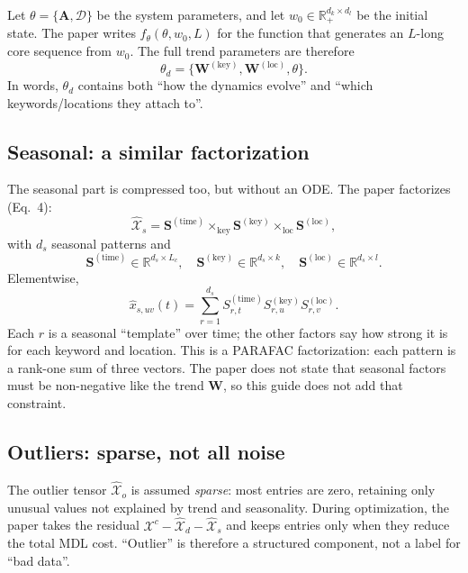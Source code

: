 Let $\theta=\{\mathbf{A},\mathcal{D}\}$ be the system parameters, and let
$w_0\in\mathbb{R}_{+}^{d_k\times d_l}$ be the initial state. The paper writes
$f_\theta(\theta,w_0,L)$ for the function that generates an $L$-long core sequence from $w_0$. The full
trend parameters are therefore
\[
  \theta_d=\{\mathbf{W}^{(\mathrm{key})},\mathbf{W}^{(\mathrm{loc})},\theta\}.
\]
In words, $\theta_d$ contains both ``how the dynamics evolve'' and ``which keywords/locations they
attach to''.

\subsection{Seasonal: a similar factorization}

The seasonal part is compressed too, but without an ODE. The paper factorizes (Eq.~4):
\begin{equation}
  \widehat{\mathcal{X}}_s
  =\mathbf{S}^{(\mathrm{time})}
   \times_{\mathrm{key}}\mathbf{S}^{(\mathrm{key})}
   \times_{\mathrm{loc}}\mathbf{S}^{(\mathrm{loc})},
  \label{eq:seasonal-factorization}
\end{equation}
with $d_s$ seasonal patterns and
\[
  \mathbf{S}^{(\mathrm{time})}\in\mathbb{R}^{d_s\times L_c},
  \quad
  \mathbf{S}^{(\mathrm{key})}\in\mathbb{R}^{d_s\times k},
  \quad
  \mathbf{S}^{(\mathrm{loc})}\in\mathbb{R}^{d_s\times l}.
\]
Elementwise,
\begin{equation}
  \widehat{x}_{s,uv}(t)
  =\sum_{r=1}^{d_s}
    S^{(\mathrm{time})}_{r,t}S^{(\mathrm{key})}_{r,u}S^{(\mathrm{loc})}_{r,v}.
  \label{eq:seasonal-elementwise}
\end{equation}
Each $r$ is a seasonal ``template'' over time; the other factors say how strong it is for each
keyword and location. This is a PARAFAC factorization: each pattern is a rank-one sum of three
vectors. The paper does not state that seasonal factors must be non-negative like the trend
$\mathbf{W}$, so this guide does not add that constraint.

\subsection{Outliers: sparse, not all noise}

The outlier tensor $\widehat{\mathcal{X}}_o$ is assumed \emph{sparse}: most entries are zero, retaining
only unusual values not explained by trend and seasonality. During optimization, the paper takes the
residual $\mathcal{X}^{c}-\widehat{\mathcal{X}}_d-\widehat{\mathcal{X}}_s$ and keeps entries only
when they reduce the total MDL cost. ``Outlier'' is therefore a structured component, not a label for
``bad data''.

